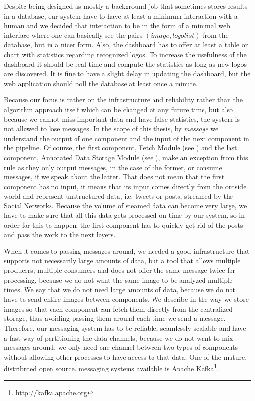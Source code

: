 Despite being designed as mostly a background job that sometimes stores
results in a database, our system have to have at least a minimum interaction
with a human and we decided that interaction to be in the form of a minimal
web interface where one can basically see the pairs \((image, logo list)\)
from the database, but in a nicer form. Also, the dashboard has to offer at
least a table or chart with statistics regarding recognized logos. To increase
the usefulness of the dashboard it should be real time and compute the
statistics as long as new logos are discovered. It is fine to have a slight
delay in updating the dashboard, but the web application should poll the
database at least once a minute.

Because our focus is rather on the infrastructure and reliability rather than
the algorithm approach itself which can be changed at any future time, but
also because we cannot miss important data and have false statistics, the system
is not allowed to lose messages. In the scope of this thesis, by
\textit{message} we understand the output of one component and the input of
the next component in the pipeline. Of course, the first component, Fetch
Module (see ) and the last
component, Annotated Data Storage Module (see
), make an exception from this rule
as they only output messages, in the case of the former, or consume messages, if we speak
about the latter. That does not mean that the first component has no input, it
means that its input comes directly from the outside world and represent
unstructured data, i.e. tweets or posts, streamed by the Social Networks.
Because the volume of steamed data can become very large, we have to make sure
that all this data gets processed on time by our system, so in order for this
to happen, the first component has to quickly get rid of the posts and pass
the work to the next layers.

When it comes to passing messages around, we needed a good infrastructure that
supports not necessarily large amounts of data, but a tool that allows multiple producers,
multiple consumers and does not offer the same message twice for processing, because we do not
want the same image to be analyzed multiple times. We say that we
do not need large amounts of data, because we do not have to send entire
images between components. We describe in
 the way we store images
so that each component can fetch them directly from the centralized storage, thus avoiding
passing them around each time we send a message. Therefore, our messaging
system has to be reliable, seamlessly scalable and have a fast way of
partitioning the data channels, because we do not want to mix messages around,
we only need one channel between two types of components without allowing
other processes to have access to that data. One of the mature, distributed
open source, messaging systems available is Apache
Kafka\footnote{\url{http://kafka.apache.org}}.

